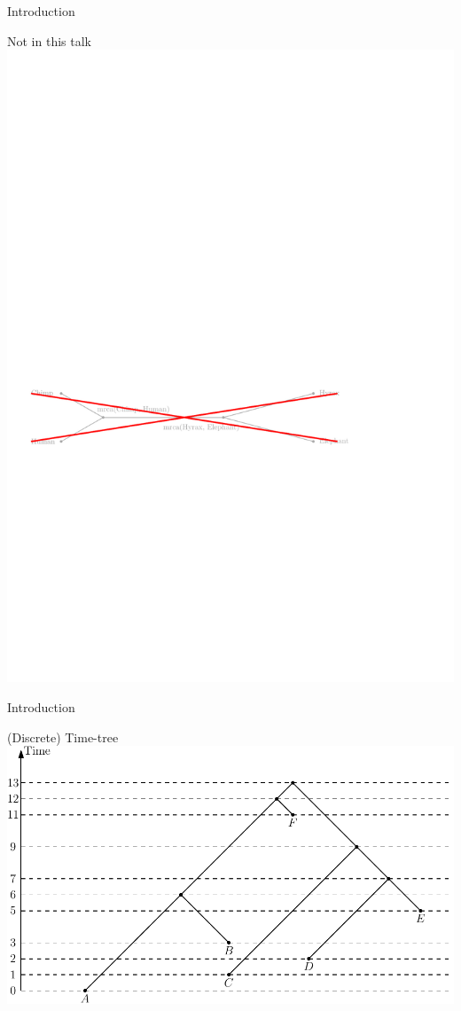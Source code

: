 \documentclass{beamer}
\theoremstyle{example}
\begin{document}
\begin{frame}{Introduction}
\begin{block}{Not in this talk}
\includegraphics[width=\framewidth]{hyraxNO}
\end{block}
\end{frame}

\begin{frame}{Introduction}
\begin{block}{(Discrete) Time-tree}
\includegraphics[width=\framewidth]{discreteTimeTree}
\end{block}
\end{frame}
\end{document}
